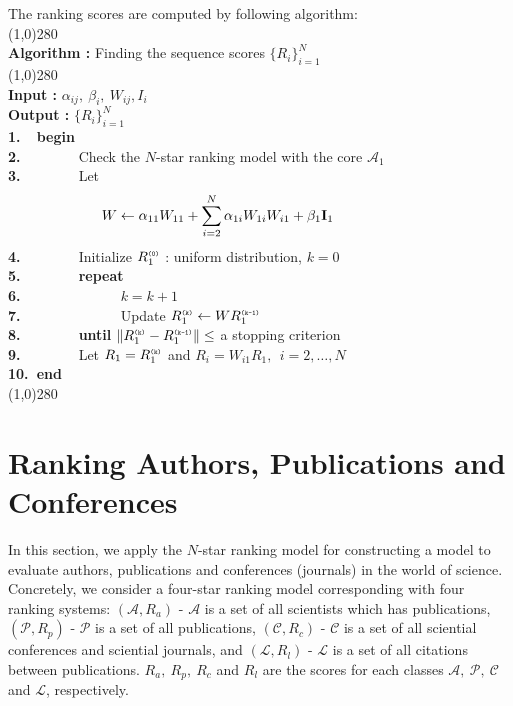 \documentclass[10pt,leqno,twoside]{article}
\begin{document}
The ranking scores are computed by following algorithm:\\
\line(1,0){280}
~\\
{\bf Algorithm :} Finding the sequence scores $\{R_i\}^N_{i=1}$
~\\[-2mm]
\line(1,0){280}\\
\vspace{2mm}\enskip\enskip\textbf{Input :} $\alpha_{ij},~\beta_i,~W_{ij},I_i$\\
\vspace{2mm}\enskip\enskip\textbf{Output :} $\{R_i\}^N_{i=1}$\\
\textbf{{\scriptsize 1.}~~begin}\\
\textbf{{\scriptsize 2.}~~}~~~~~~Check the $N$-star ranking model with the core $\mathcal{A}_1$\\
\textbf{{\scriptsize 3.}~~}~~~~~~Let\\[-7mm]
\[W \leftarrow \alpha_{11}W_{11} + \sum^N_{i=2}\alpha_{1i}W_{1i}W_{i1} + \beta_1{\bf I}_1\qquad\qquad\qquad\]
\textbf{{\scriptsize 4.}~~}~~~~~~Initialize $R^{\texttt{\tiny(0)}}_1$ : uniform distribution, $k = 0$\\
\textbf{{\scriptsize 5.}~~}~~~~~~{\bf repeat}\\
\textbf{{\scriptsize 6.}~~}~~~~~~~~~~~~$k = k + 1$\\
\textbf{{\scriptsize 7.}~~}~~~~~~~~~~~~Update $R^{\texttt{\tiny(k)}}_1 \leftarrow WR^{\texttt{\tiny(k-1)}}_1$\\
\textbf{{\scriptsize 8.}~~}~~~~~~{\bf until} $\|R^{\texttt{\tiny(k)}}_1 - R^{\texttt{\tiny(k-1)}}_1\| \leq$ a stopping criterion\\
\textbf{{\scriptsize 9.}~~}~~~~~~Let $R_1 = R^{\texttt{\tiny(k)}}_1$ and $R_i = W_{i1}R_1,~~ i = 2,\ldots,N$\\
\textbf{{\scriptsize 10.}~end}
~\\[-2mm]
\line(1,0){280}


\section{Ranking Authors, Publications and Conferences}\label{Sect:Ranking}
In this section, we apply the $N$-star ranking model for constructing a model to evaluate authors, publications and conferences (journals) in the world of science. Concretely, we consider a four-star ranking model corresponding with four ranking systems: $(\mathcal{A},R_a)$ - $\mathcal{A}$ is a set of all scientists which has publications, $(\mathcal{P},R_p)$ - $\mathcal{P}$ is a set of all publications, $(\mathcal{C},R_c)$ - $\mathcal{C}$ is a set of all sciential conferences and sciential journals, and $(\mathcal{L},R_l)$ - $\mathcal{L}$ is a set of all citations between publications. $R_a,~R_p,~R_c$ and $R_l$ are the scores for each classes $\mathcal{A},~\mathcal{P},~\mathcal{C}$ and $\mathcal{L}$, respectively.
\setlength{\parskip}{3pt}
\end{document}
